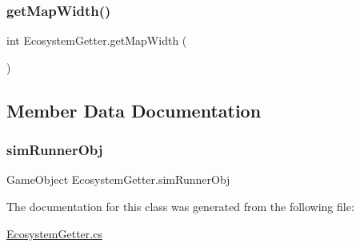 \mbox{\label{class_ecosystem_getter_a9dab6af6bc871d8e8c6f29bbdcb18483}} 
\subsubsection{\texorpdfstring{get\+Map\+Width()}{getMapWidth()}}
{\footnotesize\ttfamily int Ecosystem\+Getter.\+get\+Map\+Width (\begin{DoxyParamCaption}{ }\end{DoxyParamCaption})}



\subsection{Member Data Documentation}
\mbox{\label{class_ecosystem_getter_a2a8755cd95e4f94ee8924c699e63a2b8}} 
\subsubsection{\texorpdfstring{sim\+Runner\+Obj}{simRunnerObj}}
{\footnotesize\ttfamily Game\+Object Ecosystem\+Getter.\+sim\+Runner\+Obj}



The documentation for this class was generated from the following file\+:\begin{DoxyCompactItemize}
\item 
\mbox{\hyperlink{_ecosystem_getter_8cs}{Ecosystem\+Getter.\+cs}}\end{DoxyCompactItemize}
